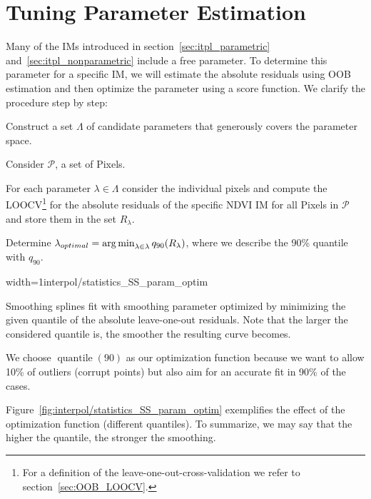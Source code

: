 \section{Tuning Parameter Estimation}{ \label{sec:itpl_param_est}
	Many of the {{IM}}s introduced in section~\ref{sec:itpl_parametric} and~\ref{sec:itpl_nonparametric} include a free parameter. To determine this parameter for a specific {{IM}}, we will estimate the absolute residuals using OOB estimation and then optimize the parameter using a score function. We clarify the procedure step by step:	
	\begin{Nenumerate}
		\item Construct a set $\Lambda$ of candidate parameters that generously covers the parameter space.
		\item Consider $\mathcal{P}$, a set of Pixels.
		\item For each parameter $\lambda \in \Lambda$ consider the individual pixels and compute the LOOCV\footnote{For a definition of the leave-one-out-cross-validation we refer to section~\ref{sec:OOB_LOOCV}.} for the absolute residuals of the specific NDVI {{IM}} for all Pixels in $\mathcal{P}$ and store them in the set $R_\lambda$. 
		\item Determine $\lambda_{optimal} = \operatorname*{arg\, min}_{\lambda\in\lambda}q_{90}(R_\lambda)$, where we describe the 90\% quantile with $q_{90}$.
	\end{Nenumerate}

	\begin{my_figure}[h]{width=1\textwidth}{interpol/statistics_SS_param_optim}
		\caption[Smoothing splines optimized by minimizing the given quantile of the absolute leave-one-out residuals]{Smoothing splines fit with smoothing parameter optimized by minimizing the given quantile of the absolute leave-one-out residuals. Note that the larger the considered quantile is, the smoother the resulting curve becomes.}
		\label{fig:interpol/statistics_SS_param_optim}
	\end{my_figure}

	We choose $\operatorname{quantile}(90)$ as our optimization function because we want to allow 10\% of outliers (corrupt points) but also aim for an accurate fit in 90\% of the cases.  
	
	Figure~\ref{fig:interpol/statistics_SS_param_optim} exemplifies the effect of the optimization function (different quantiles). To summarize, we may say that the higher the quantile, the stronger the smoothing. 
}


